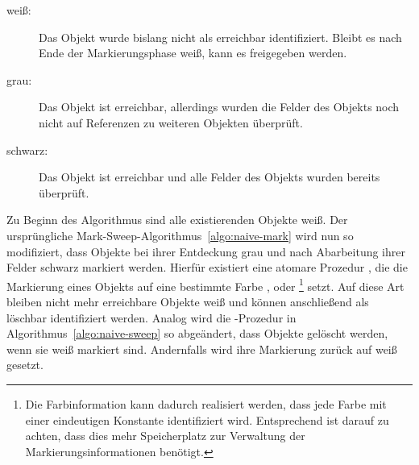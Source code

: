 \begin{description}
	\item[weiß:] Das Objekt wurde bislang nicht als erreichbar identifiziert.
		Bleibt es nach Ende der Markierungsphase weiß, kann es freigegeben werden.
	\item[grau:] Das Objekt ist erreichbar, allerdings wurden die Felder des Objekts noch nicht auf Referenzen zu weiteren Objekten überprüft.
	\item[schwarz:] Das Objekt ist erreichbar und alle Felder des Objekts wurden bereits überprüft.
\end{description}

Zu Beginn des Algorithmus sind alle existierenden Objekte weiß.
Der ursprüngliche Mark-Sweep-Algorithmus~\ref{algo:naive-mark} wird nun so modifiziert, dass Objekte bei ihrer Entdeckung grau und nach Abarbeitung ihrer Felder schwarz markiert werden.
Hierfür existiert eine atomare Prozedur , die die Markierung eines Objekts auf eine bestimmte Farbe ,  oder \footnote{Die Farbinformation kann dadurch realisiert werden, dass jede Farbe mit einer eindeutigen Konstante identifiziert wird. Entsprechend ist darauf zu achten, dass dies mehr Speicherplatz zur Verwaltung der Markierungsinformationen benötigt.} setzt.
Auf diese Art bleiben nicht mehr erreichbare Objekte weiß und können anschließend als löschbar identifiziert werden.
Analog wird die -Prozedur in Algorithmus~\ref{algo:naive-sweep} so abgeändert, dass Objekte gelöscht werden, wenn sie weiß markiert sind.
Andernfalls wird ihre Markierung zurück auf weiß gesetzt.

